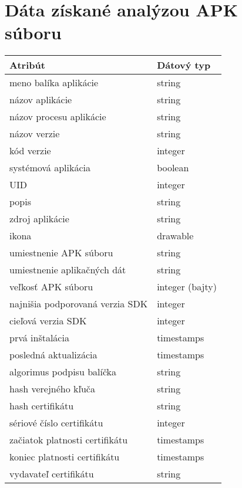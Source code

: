 \chapter{Dáta získané analýzou APK súboru}
\label{ziskaneDataPriloha}
\begin{longtable}{|l|p{3.3cm}|}
\hline
\textbf{Atribút} & \textbf{Dátový typ}          \\ \hline
meno balíka aplikácie                           & string 		  \\
názov aplikácie                                      & string             \\
názov procesu aplikácie                                      & string             \\
názov verzie                                      & string      \\
kód verzie                                      & integer \\
systémová aplikácia                                      & boolean \\
UID                                      & integer \\
popis                                      & string      \\
zdroj aplikácie							  & string \\
ikona									 & drawable \\
umiestnenie APK súboru 						& string\\
umiestnenie aplikačných dát 						& string\\
veľkosť APK súboru                                      & integer (bajty)        \\
najnišia podporovaná verzia SDK 			& integer \\
cieľová verzia SDK							& integer \\
prvá inštalácia 							& timestamps \\
posledná aktualizácia							& timestamps \\
algorimus podpisu balíčka					& string \\
hash verejného kľuča 						& string \\
hash certifikátu							& string \\
sériové číslo certifikátu					& integer \\
začiatok platnosti certifikátu				& timestamps \\
koniec platnosti certifikátu				& timestamps \\
vydavateľ certifikátu						& string\\

\end{longtable}

